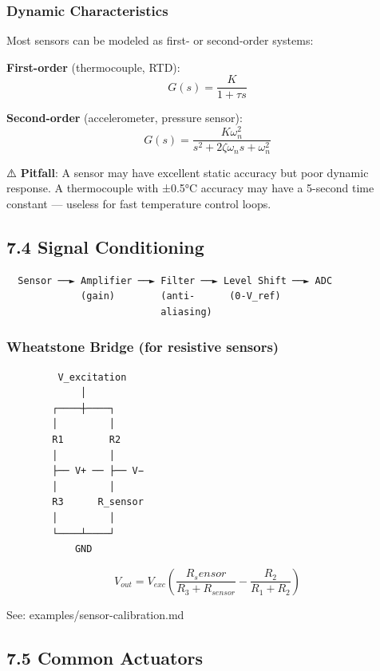 \documentclass[11pt,a4paper]{book}
\begin{document}
\subsubsection{Dynamic Characteristics}

Most sensors can be modeled as first- or second-order systems:

\textbf{First-order} (thermocouple, RTD):
\[G(s) = \frac{K}{1 + \tau s}\]

\textbf{Second-order} (accelerometer, pressure sensor):
\[G(s) = \frac{K \omega_n^2}{s^2 + 2\zeta\omega_n s + \omega_n^2}\]

⚠️ \textbf{Pitfall}: A sensor may have excellent static accuracy but poor dynamic response. A thermocouple with ±0.5°C accuracy may have a 5-second time constant — useless for fast temperature control loops.

\medskip\noindent\hrulefill\medskip

\subsection{7.4 Signal Conditioning}

\begin{lstlisting}
  Sensor ──► Amplifier ──► Filter ──► Level Shift ──► ADC
             (gain)        (anti-      (0-V_ref)
                           aliasing)
\end{lstlisting}

\subsubsection{Wheatstone Bridge (for resistive sensors)}

\begin{lstlisting}
         V_excitation
             │
        ┌────┼────┐
        │         │
        R1        R2
        │         │
        ├── V+ ── ├── V−
        │         │
        R3      R_sensor
        │         │
        └────┴────┘
            GND
\end{lstlisting}

\[V_{out} = V_{exc} \left( \frac{R_sensor}{R_3 + R_{sensor}} - \frac{R_2}{R_1 + R_2} \right)\]

See: examples/sensor-calibration.md

\medskip\noindent\hrulefill\medskip

\subsection{7.5 Common Actuators}
\end{document}
